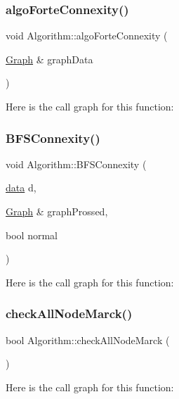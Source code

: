 \subsubsection{\texorpdfstring{algo\+Forte\+Connexity()}{algoForteConnexity()}}
{\footnotesize\ttfamily void Algorithm\+::algo\+Forte\+Connexity (\begin{DoxyParamCaption}\item[{\mbox{\hyperlink{class_graph}{Graph}} \&}]{graph\+Data }\end{DoxyParamCaption})}

Here is the call graph for this function\+:
\mbox{\label{struct_algorithm_ab6992a48b0de3c2a9cdc638761e9e531}} 
\subsubsection{\texorpdfstring{B\+F\+S\+Connexity()}{BFSConnexity()}}
{\footnotesize\ttfamily void Algorithm\+::\+B\+F\+S\+Connexity (\begin{DoxyParamCaption}\item[{\mbox{\hyperlink{_graph_8h_a98cbe1f79429fc62806b32b6e8871d9e}{data}}}]{d,  }\item[{\mbox{\hyperlink{class_graph}{Graph}} \&}]{graph\+Prossed,  }\item[{bool}]{normal }\end{DoxyParamCaption})}

Here is the call graph for this function\+:
\mbox{\label{struct_algorithm_aee02f753076dd71f76d029249c2e1e22}} 
\subsubsection{\texorpdfstring{check\+All\+Node\+Marck()}{checkAllNodeMarck()}}
{\footnotesize\ttfamily bool Algorithm\+::check\+All\+Node\+Marck (\begin{DoxyParamCaption}{ }\end{DoxyParamCaption})}

Here is the call graph for this function\+:
\mbox{\label{struct_algorithm_a86fac96d365d99c0a210f060a1daa67c}} 
